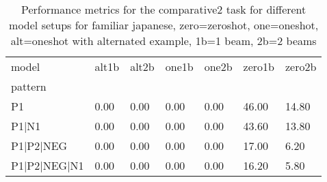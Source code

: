 \begin{table}[h]
\begin{tabular}{l|llllll}
\toprule
model & alt1b & alt2b & one1b & one2b & zero1b & zero2b \\
pattern &  &  &  &  &  &  \\
\midrule
P1 & 0.00 & 0.00 & 0.00 & 0.00 & 46.00 & 14.80 \\
P1|N1 & 0.00 & 0.00 & 0.00 & 0.00 & 43.60 & 13.80 \\
P1|P2|NEG & 0.00 & 0.00 & 0.00 & 0.00 & 17.00 & 6.20 \\
P1|P2|NEG|N1 & 0.00 & 0.00 & 0.00 & 0.00 & 16.20 & 5.80 \\
\bottomrule
\end{tabular}
\caption{Performance metrics for the comparative2 task for different model setups for familiar japanese, zero=zeroshot, one=oneshot, alt=oneshot with alternated example, 1b=1 beam, 2b=2 beams}
\label{tab:ja fam_comparative2_performance}
\end{table}
